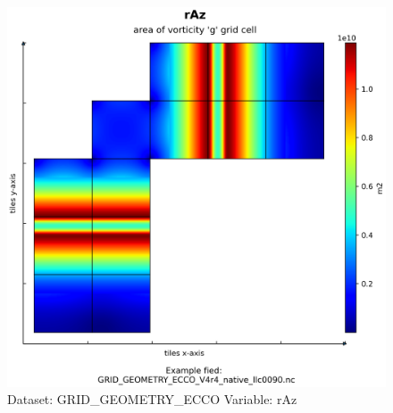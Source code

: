 \begin{figure}[H]
\centering
\includegraphics[scale=0.55]{../images/plots/native_plots_coords/Geometry_Parameters_for_the_Lat-Lon-Cap_90_(llc90)_Native_Model_Grid_(Version_4_Release_4)/rAz.png}
\caption{Dataset: GRID\_GEOMETRY\_ECCO Variable: rAz}
\label{tab:table-GRID_GEOMETRY_ECCO_rAz-Plot}
\end{figure}
\pagebreak
